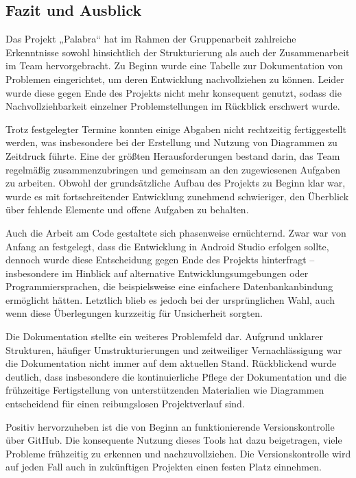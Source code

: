 \documentclass[12pt,a4paper]{article}
\begin{document}
\subsection{Fazit und Ausblick}
Das Projekt „Palabra“ hat im Rahmen der Gruppenarbeit zahlreiche Erkenntnisse sowohl hinsichtlich der Strukturierung als auch der Zusammenarbeit im Team hervorgebracht. Zu Beginn wurde eine Tabelle zur Dokumentation von Problemen eingerichtet, um deren Entwicklung nachvollziehen zu können. Leider wurde diese gegen Ende des Projekts nicht mehr konsequent genutzt, sodass die Nachvollziehbarkeit einzelner Problemstellungen im Rückblick erschwert wurde.

Trotz festgelegter Termine konnten einige Abgaben nicht rechtzeitig fertiggestellt werden, was insbesondere bei der Erstellung und Nutzung von Diagrammen zu Zeitdruck führte. Eine der größten Herausforderungen bestand darin, das Team regelmäßig zusammenzubringen und gemeinsam an den zugewiesenen Aufgaben zu arbeiten. Obwohl der grundsätzliche Aufbau des Projekts zu Beginn klar war, wurde es mit fortschreitender Entwicklung zunehmend schwieriger, den Überblick über fehlende Elemente und offene Aufgaben zu behalten.

Auch die Arbeit am Code gestaltete sich phasenweise ernüchternd. Zwar war von Anfang an festgelegt, dass die Entwicklung in Android Studio erfolgen sollte, dennoch wurde diese Entscheidung gegen Ende des Projekts hinterfragt – insbesondere im Hinblick auf alternative Entwicklungsumgebungen oder Programmiersprachen, die beispielsweise eine einfachere Datenbankanbindung ermöglicht hätten. Letztlich blieb es jedoch bei der ursprünglichen Wahl, auch wenn diese Überlegungen kurzzeitig für Unsicherheit sorgten.

Die Dokumentation stellte ein weiteres Problemfeld dar. Aufgrund unklarer Strukturen, häufiger Umstrukturierungen und zeitweiliger Vernachlässigung war die Dokumentation nicht immer auf dem aktuellen Stand. Rückblickend wurde deutlich, dass insbesondere die kontinuierliche Pflege der Dokumentation und die frühzeitige Fertigstellung von unterstützenden Materialien wie Diagrammen entscheidend für einen reibungslosen Projektverlauf sind.

Positiv hervorzuheben ist die von Beginn an funktionierende Versionskontrolle über GitHub. Die konsequente Nutzung dieses Tools hat dazu beigetragen, viele Probleme frühzeitig zu erkennen und nachzuvollziehen. Die Versionskontrolle wird auf jeden Fall auch in zukünftigen Projekten einen festen Platz einnehmen.
\end{document}
